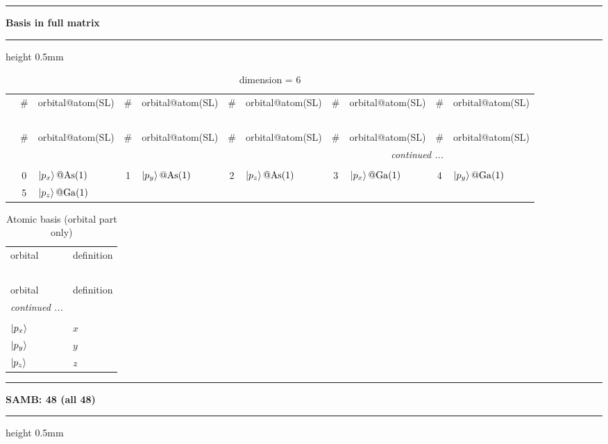 \documentclass[fleqn,10pt,landscape]{jsarticle}
\begin{document}
\vspace{5mm}
\noindent \rule[0.5mm]{5mm}{0.5mm}\hspace{3mm}\textbf{Basis in full matrix}\hspace{3mm}\leaders\hrule height 0.5mm\hfill\kern0pt
\vspace{3mm}

\renewcommand{\arraystretch}{1.6}
\begin{longtable}[l]{c|cl|cl|cl|cl|cl}
\captionsetup{justification=raggedright, singlelinecheck=off}
\caption{dimension = 6}
 \\
 \hline \hline
 & \# & orbital@atom(SL) & \# & orbital@atom(SL) & \# & orbital@atom(SL) & \# & orbital@atom(SL) & \# & orbital@atom(SL) \\ \hline \endfirsthead

\multicolumn{10}{l}{\tablename\ \thetable{}} \\
 \hline \hline
 & \# & orbital@atom(SL) & \# & orbital@atom(SL) & \# & orbital@atom(SL) & \# & orbital@atom(SL) & \# & orbital@atom(SL) \\ \hline \endhead

 \hline \hline
\multicolumn{10}{r}{\footnotesize\it continued ...} \\ \endfoot

 \hline \hline
\multicolumn{10}{r}{} \\ \endlastfoot

 & 0 & $\ket{p_{x}}@{\rm As}(1)$ & 1 & $\ket{p_{y}}@{\rm As}(1)$ & 2 & $\ket{p_{z}}@{\rm As}(1)$ & 3 & $\ket{p_{x}}@{\rm Ga}(1)$ & 4 & $\ket{p_{y}}@{\rm Ga}(1)$ \\
& 5 & $\ket{p_{z}}@{\rm Ga}(1)$ &  &  &  &  &  &  &  &  \\
\end{longtable}
\renewcommand{\arraystretch}{1.6}
\begin{longtable}[l]{ll}
\captionsetup{justification=raggedright, singlelinecheck=off}
\caption{Atomic basis (orbital part only)}
 \\
 \hline \hline
orbital & definition \\ \hline \endfirsthead

\multicolumn{1}{l}{\tablename\ \thetable{}} \\
 \hline \hline
orbital & definition \\ \hline \endhead

 \hline \hline
\multicolumn{1}{r}{\footnotesize\it continued ...} \\ \endfoot

 \hline \hline
\multicolumn{1}{r}{} \\ \endlastfoot

$ \ket{p_{x}} $ & $ x $ \\
$ \ket{p_{y}} $ & $ y $ \\
$ \ket{p_{z}} $ & $ z $ \\
\end{longtable}
\vspace{5mm}
\noindent \rule[0.5mm]{5mm}{0.5mm}\hspace{3mm}\textbf{SAMB: 48 (all 48)}\hspace{3mm}\leaders\hrule height 0.5mm\hfill\kern0pt
\vspace{3mm}
\end{document}
